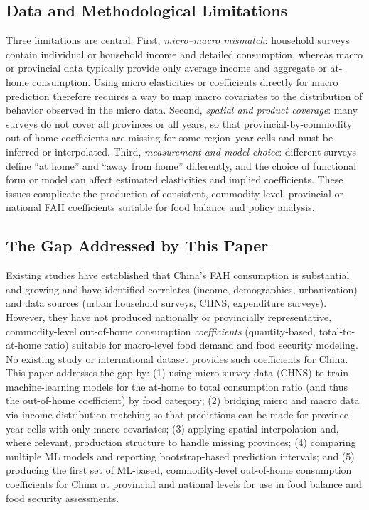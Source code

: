 \subsection{Data and Methodological Limitations}

Three limitations are central. First, \emph{micro--macro mismatch}: household surveys contain individual or household income and detailed consumption, whereas macro or provincial data typically provide only average income and aggregate or at-home consumption. Using micro elasticities or coefficients directly for macro prediction therefore requires a way to map macro covariates to the distribution of behavior observed in the micro data. Second, \emph{spatial and product coverage}: many surveys do not cover all provinces or all years, so that provincial-by-commodity out-of-home coefficients are missing for some region--year cells and must be inferred or interpolated. Third, \emph{measurement and model choice}: different surveys define ``at home'' and ``away from home'' differently, and the choice of functional form or model can affect estimated elasticities and implied coefficients. These issues complicate the production of consistent, commodity-level, provincial or national FAH coefficients suitable for food balance and policy analysis.

\subsection{The Gap Addressed by This Paper}

Existing studies have established that China's FAH consumption is substantial and growing and have identified correlates (income, demographics, urbanization) and data sources (urban household surveys, CHNS, expenditure surveys). However, they have not produced nationally or provincially representative, commodity-level out-of-home consumption \emph{coefficients} (quantity-based, total-to-at-home ratio) suitable for macro-level food demand and food security modeling. No existing study or international dataset provides such coefficients for China. This paper addresses the gap by: (1) using micro survey data (CHNS) to train machine-learning models for the at-home to total consumption ratio (and thus the out-of-home coefficient) by food category; (2) bridging micro and macro data via income-distribution matching so that predictions can be made for province-year cells with only macro covariates; (3) applying spatial interpolation and, where relevant, production structure to handle missing provinces; (4) comparing multiple ML models and reporting bootstrap-based prediction intervals; and (5) producing the first set of ML-based, commodity-level out-of-home consumption coefficients for China at provincial and national levels for use in food balance and food security assessments.
